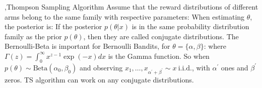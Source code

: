 \documentclass[10pt]{report}
\begin{document}
\sep{Thompson Sampling Algorithm}
Assume that the reward distributions of different arms belong to the same family with respective parameters:
When estimating $\theta$, the posterior is:
If the posterior $p(\theta|x)$ is in the same probability distribution family as the prior $p(\theta)$, then they are called conjugate distributions.
The Bernoulli-Beta is important for Bernoulli Bandits, for $\theta=\{\alpha,\beta\}$:
where $\Gamma(z)=\int_{0}^{\infty}x^{z-1}\exp(-x)dx$ is the Gamma function. So when $p(\theta)\sim\mathrm{Beta}(\alpha_{0},\beta_{0})$ and
observing $x_1,\ldots,x_{\alpha^{\prime}+\beta^{\prime}}\sim x\mathrm{~i.i.d.}$, with $\alpha^\prime$ ones and $\beta^\prime$ zeros.
TS algorithm can work on any conjugate distributions.
\end{document}
